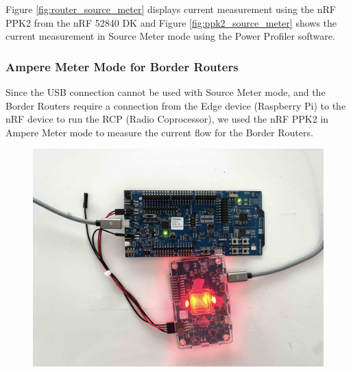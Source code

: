 Figure \ref{fig:router_source_meter} displays current measurement using the nRF PPK2 from the nRF 52840 DK and Figure \ref{fig:ppk2_source_meter} shows the current measurement in Source Meter mode using the Power Profiler software.

\subsubsection{Ampere Meter Mode for Border Routers}\label{sec:ampere_meter_mode}
Since the USB connection cannot be used with Source Meter mode, and the Border Routers require a connection from the Edge device (Raspberry Pi) to the nRF device to run the RCP (Radio Coprocessor), we used the nRF PPK2 in Ampere Meter mode to measure the current flow for the Border Routers.

\begin{figure}[h]
    \centering
    \begin{minipage}[t]{0.45\textwidth}
        \centering
        \includegraphics[width=1\linewidth]{images/research_design/PPK2_Border_Router.jpg}
        \label{fig:border_router_ampere_meter}
    \end{minipage}\hfill
    \begin{minipage}[t]{0.45\textwidth}
        \centering

\end{minipage}
\end{figure}
